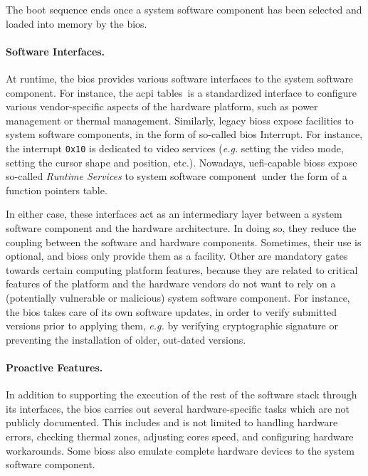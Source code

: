 The boot sequence ends once a system software component has been selected and
loaded into memory by the \ac{bios}.

\paragraph{Software Interfaces.}
At runtime, the \ac{bios} provides various software interfaces to the system
software component.
%
For instance, the \ac{acpi} tables\,\cite{uefi2017acpi,duflot2010acpi} is a
standardized interface to configure various vendor-specific aspects of the
hardware platform, such as power management or thermal management.
%
Similarly, legacy \acp{bios} expose facilities to system software components, in
the form of so-called \ac{bios} Interrupt.
%
For instance, the interrupt \texttt{0x10} is dedicated to video services
(\emph{e.g.} setting the video mode, setting the cursor shape and position,
etc.).
%
Nowadays, \ac{uefi}-capable \acp{bios} expose so-called \emph{Runtime Services}
to system software component\,\cite[Chapter 5]{zimmer2017uefi} under the form of
a function pointers table.

In either case, these interfaces act as an intermediary layer between a system
software component and the hardware architecture.
%
In doing so, they reduce the coupling between the software and hardware
components.
%
Sometimes, their use is optional, and \acp{bios} only provide them as a
facility.
%
Other are mandatory gates towards certain computing platform features, because
they are related to critical features of the platform and the hardware vendors
do not want to rely on a (potentially vulnerable or malicious) system software
component.
%
For instance, the \ac{bios} takes care of its own software updates, in order to
verify submitted versions prior to applying them, \emph{e.g.} by verifying
cryptographic signature or preventing the installation of older, out-dated
versions.

\paragraph{Proactive Features.}
%
In addition to supporting the execution of the rest of the software stack
through its interfaces, the \ac{bios} carries out several hardware-specific
tasks which are not publicly documented.
%
This includes and is not limited to handling hardware errors, checking thermal
zones, adjusting cores speed, and configuring hardware workarounds.
%
Some \acp{bios} also emulate complete hardware devices to the system software
component.

